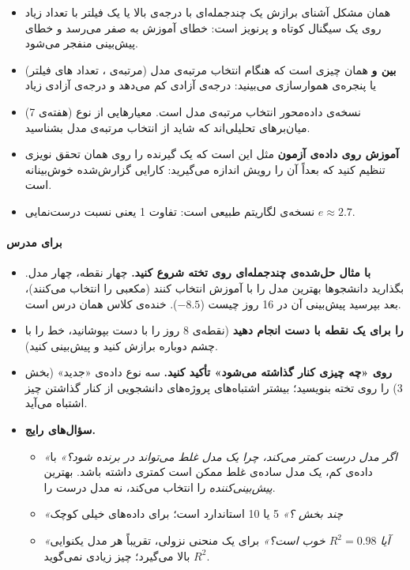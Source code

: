 \begin{itemize}
\tightlist
\item
  \textbf{} همان مشکل آشنای برازش یک چندجمله‌ای با درجه‌ی
  بالا یا یک فیلتر با تعداد  زیاد روی یک سیگنال کوتاه و پرنویز
  است: خطای آموزش به صفر می‌رسد و خطای پیش‌بینی منفجر می‌شود.
\item
  \textbf{ بین  و } همان چیزی است که
  هنگام انتخاب مرتبه‌ی مدل (مرتبه‌ی ، تعداد های فیلتر) یا
  پنجره‌ی هموارسازی می‌بینید: درجه‌ی آزادی کم  می‌دهد و درجه‌ی آزادی
  زیاد 
\item
  \textbf{} نسخه‌ی داده‌محور انتخاب مرتبه‌ی مدل است.
  معیارهایی از نوع  (هفته‌ی 7) میان‌برهای تحلیلی‌اند که شاید از
  انتخاب مرتبه‌ی مدل  بشناسید.
\item
  \textbf{آموزش روی داده‌ی آزمون} مثل این است که یک گیرنده را روی همان
  تحقق نویزی تنظیم کنید که بعداً  آن را رویش اندازه می‌گیرید:
  کارایی گزارش‌شده خوش‌بینانه است.
\item
  \textbf{} نسخه‌ی لگاریتم طبیعی  است: تفاوت 1 
  یعنی نسبت درست‌نمایی \(e \approx 2.7\).
\end{itemize}

\paragraph{برای مدرس}

\begin{itemize}
\tightlist
\item
  \textbf{با مثال حل‌شده‌ی چندجمله‌ای روی تخته شروع کنید.} چهار نقطه، چهار
  مدل. بگذارید دانشجوها بهترین مدل را با  آموزش انتخاب کنند
  (مکعبی را انتخاب می‌کنند)، بعد بپرسید پیش‌بینی آن در 16 روز چیست
  (\(-8.5\)). خنده‌ی کلاس همان درس است.
\item
  \textbf{ را برای یک نقطه با دست انجام دهید} (نقطه‌ی 8
  روز را با دست بپوشانید، خط را با چشم دوباره برازش کنید و پیش‌بینی
  کنید).
\item
  \textbf{روی «چه چیزی کنار گذاشته می‌شود» تأکید کنید.} سه نوع داده‌ی
  «جدید» (بخش 3) را روی تخته بنویسید؛ بیشتر اشتباه‌های پروژه‌های دانشجویی
  از کنار گذاشتن چیز اشتباه می‌آید.
\item
  \textbf{سؤال‌های رایج.}

  \begin{itemize}
  \tightlist
  \item
    \emph{«اگر مدل درست کمتر  می‌کند، چرا یک مدل غلط می‌تواند
    در  برنده شود؟»} با داده‌ی کم، یک مدل ساده‌ی غلط ممکن است
     کمتری داشته باشد.  بهترین \emph{پیش‌بینی‌کننده}
    را انتخاب می‌کند، نه مدل درست را.
  \item
    \emph{«چند بخش ؟»} 5 یا 10 استاندارد است؛ برای داده‌های
    خیلی کوچک 
  \item
    \emph{«آیا \(R^2 = 0.98\) خوب است؟»} برای یک منحنی نزولی، تقریباً هر
    مدل یکنوایی \(R^2\) بالا می‌گیرد؛ چیز زیادی نمی‌گوید.
  \end{itemize}
\end{itemize}

